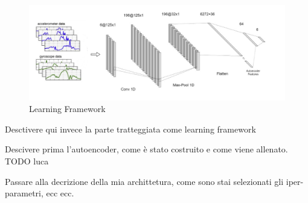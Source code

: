 \begin{figure}[h]
	\centering
	\includegraphics[width=1\textwidth]{images/full_architecture.jpg}
	\caption{Learning Framework}
\end{figure}

Desctivere qui invece la parte tratteggiata come learning framework

Descivere prima l'autoencoder, come è stato costruito e come viene allenato. TODO luca

Passare alla decrizione della mia archittetura, come sono stai selezionati gli iper-parametri, ecc ecc.
